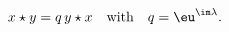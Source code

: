 \begin{equation}
    \label{eq:quantumplane}
    x \star y = q \, y \star x
    \quad
    \textrm{with}
    \quad
    q = \eu^{\im\lambda}.
\end{equation}

